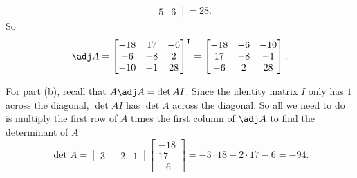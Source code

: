 \begin{questions}
\begin{solution}
\begin{align*}
\begin{bmatrix}
        5&6
      \end{bmatrix}=28.
    \end{align*}
    So
    \[
      \adj A=
      \begin{bmatrix}
        -18&17&-6\\
        -6&-8&2\\
        -10&-1&28\\
      \end{bmatrix}^\intercal
      =
      \begin{bmatrix}
        -18&-6&-10\\
        17&-8&-1\\
        -6&2&28
      \end{bmatrix}.
    \]

    For part (b), recall that $A\adj A=\det A I$. Since the identity matrix
    $I$ only has $1$ across the diagonal, $\det A I$ has $\det A$ across
    the diagonal. So all we need to do is multiply the first row of $A$
    times the first column of $\adj A$ to find the determinant of $A$
    \[
      \det A=\begin{bmatrix}3&-2&1\end{bmatrix}
      \begin{bmatrix}-18\\17\\-6\end{bmatrix}
      =-3\cdot 18-2\cdot 17-6=-94.
    \]
  \end{solution}
\end{questions}
